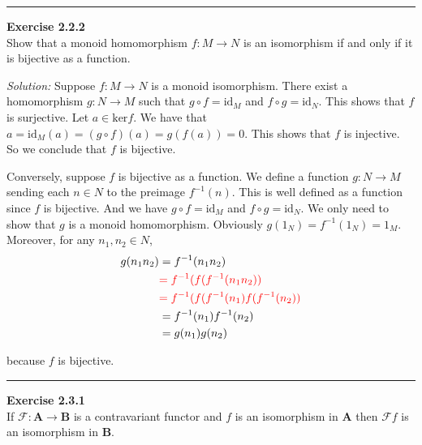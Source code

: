 \documentclass[a4paper, 12pt]{article}
\newenvironment{problem}[2][Exercise]
    { \begin{mdframed}[backgroundcolor=gray!20] \textbf{#1 #2} \\}
    {  \end{mdframed}}
\newenvironment{solution}
    {\textit{Solution:}}
    {}
\begin{document}
\noindent\rule{7in}{2.8pt}
\begin{problem}{2.2.2}
Show that a monoid homomorphism \(f:M\rightarrow N\) is an isomorphism if and only if it is bijective as a function.
\end{problem}
\begin{solution}
Suppose \(f:M\rightarrow N\) is a monoid isomorphism. There exist a homomorphism \(g:N\rightarrow M\) such that \(g\circ f=\text{id}_M\) and 
\(f\circ g=\text{id}_N\). This shows that \(f\) is surjective. Let \(a\in \text{ker}f\). We have that \(a=\text{id}_M(a)=(g\circ f)(a)=g(f(a))=0\). This shows that 
\(f\) is injective. So we conclude that \(f\) is bijective.
\par  
Conversely, suppose \(f\) is bijective as a function. We define a function \(g:N\rightarrow M\) sending each \(n\in N\) to the preimage \(f^{-1}(n)\). This is well defined as a function 
since \(f\) is bijective. And we have \(g\circ f=\text{id}_M\) and \(f\circ g=\text{id}_N\). We only need to show that \(g\) is a monoid homomorphism. Obviously \(g(1_N)=f^{-1}(1_N)=1_M\). Moreover, 
for any \(n_1,n_2\in N\), 
\begin{align*}
g(n_1n_2) & =f^{-1}(n_1n_2)\\ 
          & \textcolor{red}{=f^{-1}(f(f^{-1}(n_1n_2))}\\ 
          & \textcolor{red}{=f^{-1}(f(f^{-1}(n_1)f(f^{-1}(n_2))}\\
          & =f^{-1}(n_1)f^{-1}(n_2)\\ 
          & =g(n_1)g(n_2)   
\end{align*}

because \(f\) is bijective.
\end{solution}
\\ 
\noindent\rule{7in}{2.8pt}
\begin{problem}{2.3.1}
If \(\mathcal{F}:\mathbf{A}\rightarrow \mathbf{B}\) is a contravariant functor and \(f\) is an isomorphism in \(\mathbf{A}\) then \(\mathcal{F}f\) is an isomorphism in \(\mathbf{B}\).
\end{problem}
\end{document}
